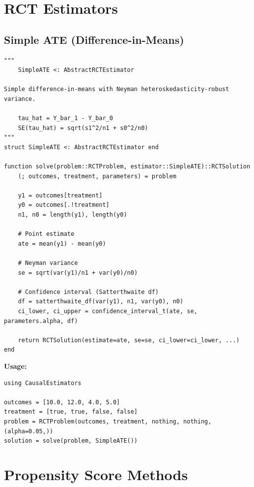 \section{RCT Estimators}
\label{sec:julia_rct}

\subsection{Simple ATE (Difference-in-Means)}

\begin{verbatim}
"""
    SimpleATE <: AbstractRCTEstimator

Simple difference-in-means with Neyman heteroskedasticity-robust variance.

    tau_hat = Y_bar_1 - Y_bar_0
    SE(tau_hat) = sqrt(s1^2/n1 + s0^2/n0)
"""
struct SimpleATE <: AbstractRCTEstimator end

function solve(problem::RCTProblem, estimator::SimpleATE)::RCTSolution
    (; outcomes, treatment, parameters) = problem

    y1 = outcomes[treatment]
    y0 = outcomes[.!treatment]
    n1, n0 = length(y1), length(y0)

    # Point estimate
    ate = mean(y1) - mean(y0)

    # Neyman variance
    se = sqrt(var(y1)/n1 + var(y0)/n0)

    # Confidence interval (Satterthwaite df)
    df = satterthwaite_df(var(y1), n1, var(y0), n0)
    ci_lower, ci_upper = confidence_interval_t(ate, se, parameters.alpha, df)

    return RCTSolution(estimate=ate, se=se, ci_lower=ci_lower, ...)
end
\end{verbatim}

\textbf{Usage:}
\begin{verbatim}
using CausalEstimators

outcomes = [10.0, 12.0, 4.0, 5.0]
treatment = [true, true, false, false]
problem = RCTProblem(outcomes, treatment, nothing, nothing, (alpha=0.05,))
solution = solve(problem, SimpleATE())
\end{verbatim}

\section{Propensity Score Methods}
\label{sec:julia_psm}

